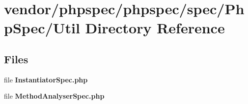 \section{vendor/phpspec/phpspec/spec/\+Php\+Spec/\+Util Directory Reference}
\label{dir_7a1df2be6aa7f24f30cf9db81825219c}
\subsection*{Files}
\begin{DoxyCompactItemize}
\item 
file {\bf Instantiator\+Spec.\+php}
\item 
file {\bf Method\+Analyser\+Spec.\+php}
\end{DoxyCompactItemize}
